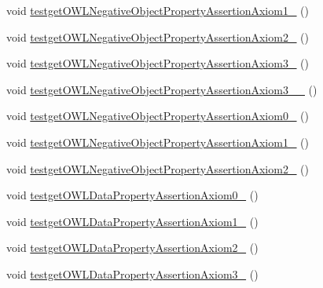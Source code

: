 \begin{DoxyCompactItemize}
\item 
void \hyperlink{classorg_1_1semanticweb_1_1owlapi_1_1api_1_1test_1_1_null_check_test_case_a431482f03650548c46a23661d6da1bf1}{testget\-O\-W\-L\-Negative\-Object\-Property\-Assertion\-Axiom1\-\_} ()
\item 
void \hyperlink{classorg_1_1semanticweb_1_1owlapi_1_1api_1_1test_1_1_null_check_test_case_aebe2158fcd13382c1a43f644d0d7b3d5}{testget\-O\-W\-L\-Negative\-Object\-Property\-Assertion\-Axiom2\-\_} ()
\item 
void \hyperlink{classorg_1_1semanticweb_1_1owlapi_1_1api_1_1test_1_1_null_check_test_case_aa3426e6d9e4884c1ba62ee77c7a00d21}{testget\-O\-W\-L\-Negative\-Object\-Property\-Assertion\-Axiom3\-\_} ()
\item 
void \hyperlink{classorg_1_1semanticweb_1_1owlapi_1_1api_1_1test_1_1_null_check_test_case_a15e100627b5d8f145b49e9a5d78a843a}{testget\-O\-W\-L\-Negative\-Object\-Property\-Assertion\-Axiom3\-\_\-\_} ()
\item 
void \hyperlink{classorg_1_1semanticweb_1_1owlapi_1_1api_1_1test_1_1_null_check_test_case_a0dd678655193eeee96011dcb473a805e}{testget\-O\-W\-L\-Negative\-Object\-Property\-Assertion\-Axiom0\-\_} ()
\item 
void \hyperlink{classorg_1_1semanticweb_1_1owlapi_1_1api_1_1test_1_1_null_check_test_case_a7223fe4acd7a667a1e93bd740bf09d7e}{testget\-O\-W\-L\-Negative\-Object\-Property\-Assertion\-Axiom1\-\_} ()
\item 
void \hyperlink{classorg_1_1semanticweb_1_1owlapi_1_1api_1_1test_1_1_null_check_test_case_a8513b10d4c71a344f39d6e37e341c34c}{testget\-O\-W\-L\-Negative\-Object\-Property\-Assertion\-Axiom2\-\_} ()
\item 
void \hyperlink{classorg_1_1semanticweb_1_1owlapi_1_1api_1_1test_1_1_null_check_test_case_a731e826e06a266d31c82718396563600}{testget\-O\-W\-L\-Data\-Property\-Assertion\-Axiom0\-\_} ()
\item 
void \hyperlink{classorg_1_1semanticweb_1_1owlapi_1_1api_1_1test_1_1_null_check_test_case_a9119f7bc54009003494f7c0184b10042}{testget\-O\-W\-L\-Data\-Property\-Assertion\-Axiom1\-\_} ()
\item 
void \hyperlink{classorg_1_1semanticweb_1_1owlapi_1_1api_1_1test_1_1_null_check_test_case_a8df20c0d690dc1622dc2d3ff64af8ff9}{testget\-O\-W\-L\-Data\-Property\-Assertion\-Axiom2\-\_} ()
\item 
void \hyperlink{classorg_1_1semanticweb_1_1owlapi_1_1api_1_1test_1_1_null_check_test_case_a86d03899b64802fd65a0ab52161b13e1}{testget\-O\-W\-L\-Data\-Property\-Assertion\-Axiom3\-\_} ()

\end{DoxyCompactItemize}
